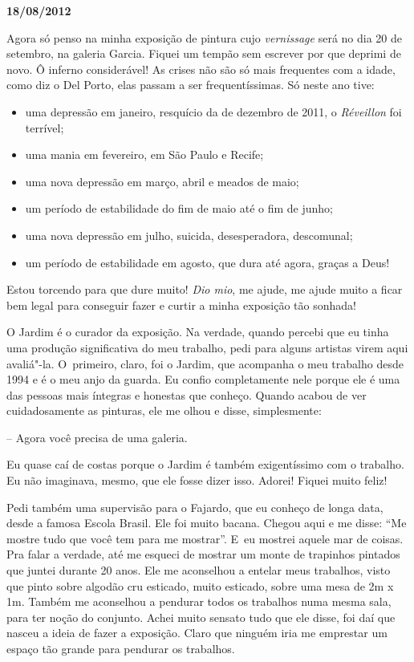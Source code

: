 \begin{center}\asterisc{}\end{center}

\begin{flushright}\textbf{18/08/2012}\end{flushright}


Agora só penso na minha exposição de pintura cujo \emph{vernissage} será
no dia 20 de setembro, na galeria Garcia. Fiquei um tempão sem escrever
por que deprimi de novo. Ô inferno considerável! As crises não são só
mais frequentes com a idade, como diz o Del Porto, elas passam a ser
frequentíssimas. Só neste ano tive:

\begin{itemize}
\item
  uma depressão em janeiro, resquício da de dezembro de 2011, o
  \emph{Réveillon} foi terrível;
\item
  uma mania em fevereiro, em São Paulo e Recife;
\item
  uma nova depressão em março, abril e meados de maio;
\item
  um período de estabilidade do fim de maio até o fim de junho;
\item
  uma nova depressão em julho, suicida, desesperadora, descomunal;
\item
  um período de estabilidade em agosto, que dura até agora, graças a
  Deus!
\end{itemize}

Estou torcendo para que dure muito! \emph{Dio mio}, me ajude, me ajude
muito a ficar bem legal para conseguir fazer e curtir a minha exposição
tão sonhada!

O Jardim é o curador da exposição. Na verdade, quando percebi que eu
tinha uma produção significativa do meu trabalho, pedi para alguns
artistas virem aqui avaliá"-la. O~primeiro, claro, foi o Jardim, que
acompanha o meu trabalho desde 1994 e é o meu anjo da guarda. Eu confio
completamente nele porque ele é uma das pessoas mais íntegras e honestas
que conheço. Quando acabou de ver cuidadosamente as pinturas, ele me
olhou e disse, simplesmente:

-- Agora você precisa de uma galeria.

Eu quase caí de costas porque o Jardim é também exigentíssimo com o
trabalho. Eu não imaginava, mesmo, que ele fosse dizer isso. Adorei!
Fiquei muito feliz!

Pedi também uma supervisão para o Fajardo, que eu conheço de longa data,
desde a famosa Escola Brasil. Ele foi muito bacana. Chegou aqui e me
disse: ``Me mostre tudo que você tem para me mostrar''. E~eu mostrei
aquele mar de coisas. Pra falar a verdade, até me esqueci de mostrar um
monte de trapinhos pintados que juntei durante 20 anos. Ele me
aconselhou a entelar meus trabalhos, visto que pinto sobre algodão cru
esticado, muito esticado, sobre uma mesa de 2m x 1m. Também me
aconselhou a pendurar todos os trabalhos numa mesma sala, para ter noção
do conjunto. Achei muito sensato tudo que ele disse, foi daí que nasceu
a ideia de fazer a exposição. Claro que ninguém iria me emprestar um
espaço tão grande para pendurar os trabalhos.


